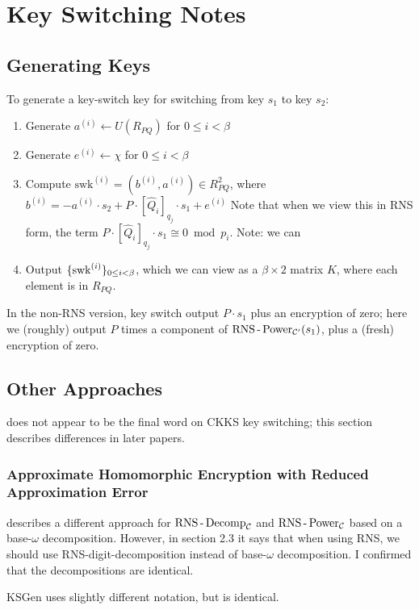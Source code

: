 

\section{Key Switching Notes}
\subsection{Generating Keys}
To generate a key-switch key for switching from key $s_1$ to key $s_2$:
\begin{enumerate}
	\item Generate $a^{(i)} \leftarrow U(R_{PQ})$ for $0\le i < \beta$
	\item Generate $e^{(i)} \leftarrow \chi$ for $0\le i < \beta$
	\item Compute $\mathrm{swk}^{(i)} = (b^{(i)}, a^{(i)})\in R^2_{PQ}$, where $b^{(i)} = -a^{(i)}\cdot s_2 + P\cdot[\hat{Q}_i]_{q_j}\cdot s_1 + e^{(i)}$ Note that when we view this in RNS form, the term $P\cdot[\hat{Q}_i]_{q_j}\cdot s_1 \cong 0 \bmod p_i$.
	Note: we can 
	\item Output $\{\mathrm{swk}^{(i)}\}_{0\le i < \beta}$, which we can view as a $\beta\times 2$ matrix $K$, where each element is in $R_{PQ}$.
\end{enumerate}

In the non-RNS version, key switch output $P\cdot s_1$ plus an encryption of zero; here we (roughly) output $P$ times a component of $\mathrm{RNS\operatorname*{\text{-}} Power}_{\mathcal{C}'}(s_1)$, plus a (fresh) encryption of zero.

\subsection{Other Approaches}
\cite{cryptoeprint:2019/688} does not appear to be the final word on CKKS key switching; this section describes differences in later papers. 

\subsubsection{Approximate Homomorphic Encryption with Reduced Approximation Error}
\cite{cryptoeprint:2020/1118} describes a different approach for $\mathrm{RNS\operatorname*{\text{-}} Decomp}_\mathcal{C}$ and $\mathrm{RNS\operatorname*{\text{-}} Power}_\mathcal{C}$ based on a base-$\omega$ decomposition. However, in section 2.3 it says that when using RNS, we should use RNS-digit-decomposition instead of base-$\omega$ decomposition. I confirmed that the decompositions are identical.

$\mathrm{KSGen}$ uses slightly different notation, but is identical.
